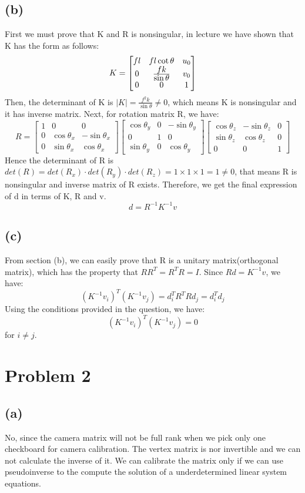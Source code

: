 \documentclass[letterpaper]{article}
\begin{document}
\subsection*{(b)}
First we must prove that K and R is nonsingular, in lecture we have shown that K has the form as follows:
$$K = 
\begin{bmatrix}
fl & fl\cot{\theta} & u_0\\
0 & \frac{\displaystyle fk}{\displaystyle \sin{\theta}} & v_0\\
0 & 0 & 1
\end{bmatrix}
$$
Then, the determinant of K is $|K| = \tfrac{f^2k}{\sin{\theta}} \neq 0$, which means K is nonsingular and it has inverse matrix. Next, for rotation matrix R, we have:
$$R = \begin{bmatrix}
1 & 0 & 0\\
0 & \cos{\theta_x} & -\sin{\theta_x}\\
0 & \sin{\theta_x} & \cos{\theta_x}
\end{bmatrix}
\begin{bmatrix}
\cos{\theta_y} & 0 & -\sin{\theta_y}\\
0 & 1 & 0\\
\sin{\theta_y} & 0 & \cos{\theta_y}
\end{bmatrix}
\begin{bmatrix}
\cos{\theta_z} & -\sin{\theta_z} & 0\\
\sin{\theta_z} & \cos{\theta_z} & 0\\
0 & 0 & 1
\end{bmatrix}
$$
Hence the determinant of R is $det(R) = det(R_x)\cdot det(R_y) \cdot det(R_z) = 1\times 1\times 1 = 1 \neq 0$, that means R is nonsingular and inverse matrix of R exists. Therefore, we get the final expression of d in terms of K, R and v.
$$d = R^{-1}K^{-1}v$$
\subsection*{(c)}
From section (b), we can easily prove that R is a unitary matrix(orthogonal matrix), which has the property that $RR^{T} = R^TR = I$. Since $Rd = K^{-1}v$, we have:
$$\left(K^{-1}v_i\right)^T\left(K^{-1}v_j\right) = d_i^TR^TRd_j = d_i^Td_j$$
Using the conditions provided in the question, we have:
$$\left(K^{-1}v_i\right)^T\left(K^{-1}v_j\right) = 0$$
for $i \neq j$.

\section*{Problem 2}
\subsection*{(a)}
No, since the camera matrix will not be full rank when we pick only one checkboard for camera calibration. The vertex matrix is nor invertible and we can not calculate the inverse of it. We can calibrate the matrix only if we can use pseudoinverse to the compute the solution of a underdetermined linear system equations.
\end{document}
